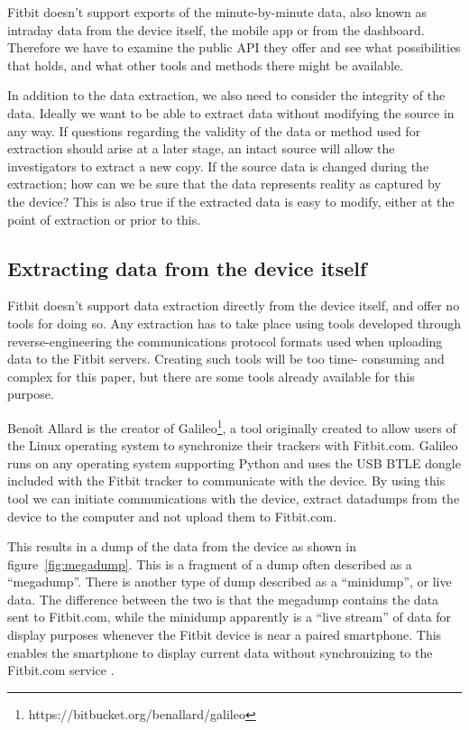 \documentclass[a4paper,11pt,dvips]{article}
\begin{document}
Fitbit doesn't support exports of the minute-by-minute data, also known as intraday data from the device itself, the mobile app or from the dashboard. Therefore we have to examine the public API they offer and see what possibilities that holds, and what other tools and methods there might be available.

In addition to the data extraction, we also need to consider the integrity of the data. Ideally we want to be able to extract data without modifying the source in any way. If questions regarding the validity of the data or method used for extraction should arise at a later stage, an intact source will allow the investigators to extract a new copy. If the source data is changed during the extraction; how can we be sure that the data represents reality as captured by the device? This is also true if the extracted data is easy to modify, either at the point of extraction or prior to this.

\subsection{Extracting data from the device itself}
Fitbit doesn't support data extraction directly from the device itself, and offer no tools for doing so. Any extraction has to take place using tools developed through reverse-engineering the communications protocol formats used when uploading data to the Fitbit servers. Creating such tools will be too time- consuming and complex for this paper, but there are some tools already available for this purpose.

Benoît Allard is the creator of Galileo\footnote{https://bitbucket.org/benallard/galileo}, a tool originally created to allow users of the Linux operating system to synchronize their trackers with Fitbit.com. Galileo runs on any operating system supporting Python and uses the USB BTLE dongle included with the Fitbit tracker to communicate with the device. By using this tool we can initiate communications with the device, extract datadumps from the device to the computer and not upload them to Fitbit.com.

This results in a dump of the data from the device as shown in figure~\ref{fig:megadump}. This is a fragment of a dump often described as a “megadump”. There is another type of dump described as a “minidump”, or live data. The difference between the two is that the megadump contains the data sent to Fitbit.com, while the minidump apparently is a “live stream” of data for display purposes whenever the Fitbit device is near a paired smartphone. This enables the smartphone to display current data without synchronizing to the Fitbit.com service \citep{cyr2014security, Aprville:2015a}.
\end{document}
